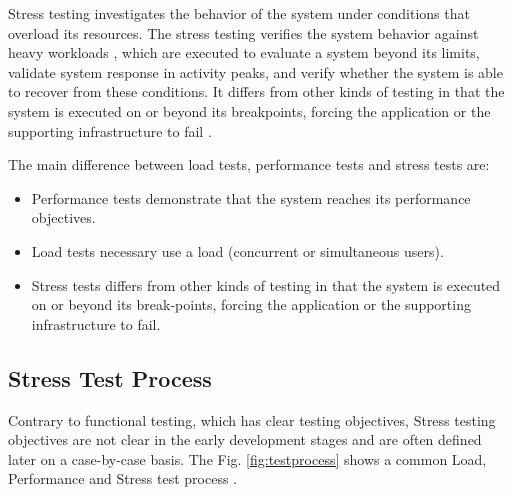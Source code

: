 \documentclass{report}
\begin{document}
Stress testing investigates the behavior of the system under conditions
that overload its resources. The stress testing verifies the system behavior against heavy workloads \cite{Sandler2004} \cite{Lewis2005}, which are executed to evaluate a system beyond its limits, validate system response in activity peaks, and verify whether the system is able to recover from these conditions. It differs from other kinds of testing in that the system is executed on or beyond its breakpoints, forcing the application or the supporting infrastructure to fail \cite{DiLucca2006} \cite{Molyneaux2009}.

The main difference between load tests, performance tests and stress tests are:

\begin{itemize}

\item Performance tests demonstrate that the system reaches its performance objectives.
\item Load tests necessary use a load (concurrent or simultaneous users).
\item Stress tests differs from other kinds of testing in that the system is executed on or beyond its break-points, forcing the application or the supporting infrastructure to fail.
\end{itemize}


\subsection{Stress Test Process}

Contrary to functional testing, which has clear testing objectives, Stress testing objectives are not clear in the early development stages and are often defined later on a case-by-case basis. The Fig. \ref{fig:testprocess} shows a common Load, Performance and Stress test process  \cite{Jiang2010}.
\end{document}
